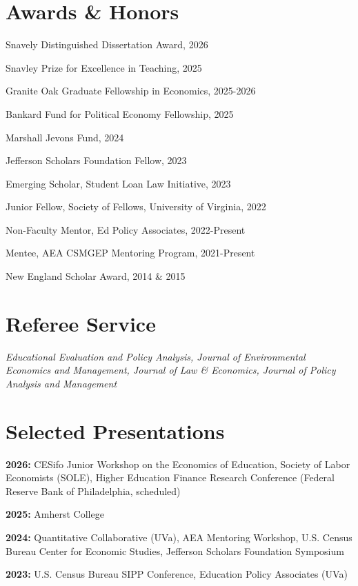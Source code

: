 \documentclass[letterpaper, 11pt]{article}
\renewenvironment{itemize}{
  \begin{list}{}
    { \setlength{\itemsep}{1.2pt} %
      \setlength{\parsep}{0pt}
      \setlength{\topsep}{0pt}
      \setlength{\leftmargin}{0em} } }{
  \end{list}}
\begin{document}
\section*{Awards \& Honors}
\begin{itemize}
\item Snavely Distinguished Dissertation Award, 2026
\item Snavley Prize for Excellence in Teaching, 2025
\item Granite Oak Graduate Fellowship in Economics, 2025-2026
\item Bankard Fund for Political Economy Fellowship, 2025
\item Marshall Jevons Fund, 2024
\item Jefferson Scholars Foundation Fellow, 2023
\item Emerging Scholar, Student Loan Law Initiative, 2023
\item Junior Fellow, Society of Fellows, University of Virginia, 2022
\item Non-Faculty Mentor, Ed Policy Associates, 2022-Present
\item Mentee, AEA CSMGEP Mentoring Program, 2021-Present
\item New England Scholar Award, 2014 \& 2015
\end{itemize}

\section*{Referee Service}
\textit{Educational Evaluation and Policy Analysis, Journal of Environmental Economics and Management, Journal of Law \& Economics, Journal of Policy Analysis and Management}

\section*{Selected Presentations}
\begin{itemize}
\item \textbf{2026:} CESifo Junior Workshop on the Economics of Education, Society of Labor Economists (SOLE), Higher Education Finance Research Conference (Federal Reserve Bank of Philadelphia, scheduled)
\item \textbf{2025:} Amherst College
\item \textbf{2024:} Quantitative Collaborative (UVa), AEA Mentoring Workshop, U.S. Census Bureau Center for Economic Studies, Jefferson Scholars Foundation Symposium
\item \textbf{2023:} U.S. Census Bureau SIPP Conference, Education Policy Associates (UVa)
\end{itemize}
\end{document}
